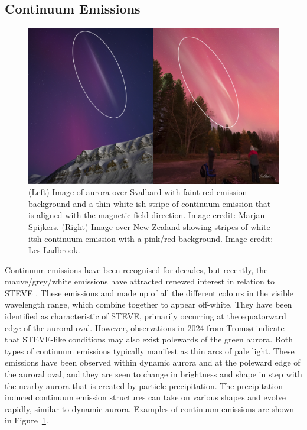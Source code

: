 \documentclass{article}
\renewcommand{\cite}[1]{\parencite{#1}}
\newcommand{\contributed}[1]{%
    \par\noindent
    \begingroup
    \setlength{\leftskip}{1em}%
    \itshape
    Contributors: #1
    \par
    \endgroup
    \vspace{0.5em}
}
\begin{document}
\subsection{Continuum Emissions}\label{continuum} 
\begin{figure}[h!]
\begin{centering}
  \includegraphics[width=\linewidth]{Fig10_Continuum.png}
  \caption{(Left) Image of aurora over Svalbard with faint red emission background and a thin white-ish stripe of continuum emission that is aligned with the magnetic field direction. Image credit: Marjan Spijkers. (Right) Image over New Zealand showing stripes of white-itsh continuum emission with a pink/red background. Image credit: Les Ladbrook.}
  \label{fig-continuumexample}
  \end{centering}
\end{figure}

Continuum emissions have been recognised for decades, but recently, the mauve/grey/white emissions have attracted renewed interest in relation to STEVE \cite{Gillies2019}. These emissions and made up of all the different colours in the visible wavelength range, which combine together to appear off-white. They have been identified as characteristic of STEVE, primarily occurring at the equatorward edge of the auroral oval. However, observations in 2024 from Tromsø \cite{Nanjo2024} indicate that STEVE-like conditions may also exist polewards of the green aurora. Both types of continuum emissions typically manifest as thin arcs of pale light. These emissions have been observed within dynamic aurora and at the poleward edge of the auroral oval, and they are seen to change in brightness and shape in step with the nearby aurora that is created by particle precipitation. The precipitation-induced continuum emission structures can take on various shapes and evolve rapidly, similar to dynamic aurora. Examples of continuum emissions are shown in Figure~\ref{fig-continuumexample}.
\end{document}
